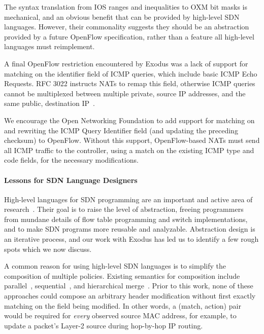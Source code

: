 The syntax translation from IOS ranges and inequalities to OXM bit masks is
mechanical, and an obvious benefit that can be provided  by high-level SDN languages.
However, their commonality suggests they should be an abstraction provided
by a future OpenFlow specification, rather than a feature all high-level languages
must reimplement.


A final OpenFlow restriction encountered by Exodus was a lack of support
for matching on the identifier field of ICMP queries, which include basic ICMP Echo
Requests. RFC 3022 instructs NATs to remap this field, otherwise ICMP
queries cannot be multiplexed between multiple private, source IP addresses,
and the same public, destination IP~\cite{rfc3022}.

We encourage the Open Networking Foundation to add support for matching
on and rewriting the ICMP Query Identifier field (and updating the preceding
checksum) to OpenFlow. Without this support, OpenFlow-based NATs
must send all ICMP traffic to the controller, using a match on the existing
ICMP type and code fields, for the necessary modifications.


\paragraph{Lessons for SDN Language Designers}

High-level languages for SDN programming are an important and active
area of research~\cite{foster:icfp11-frenetic,katta:xldi12-flog,monsanto++:nsdi13-pyretic,ngdfk:hotsdn13-flowlog,Voellmy:2011,voellmy:hotsdn12-procera,Voellmy:2013}. Their goal is to raise the level of abstraction, freeing
programmers from mundane details of flow table programming and switch
implementations, and to make SDN programs more reusable and analyzable.
Abstraction design is an iterative process, and our work with Exodus has
led us to identify a few rough spots which we now discuss.

A common reason for using high-level SDN languages is to simplify
the composition of multiple policies. Existing semantics for composition
include parallel~\cite{foster:icfp11-frenetic}, sequential~\cite{monsanto++:nsdi13-pyretic}, and hierarchical merge~\cite{Ferguson:2013sigcomm}. %
Prior to this work, none of these approaches could compose an arbitrary
header modification without first exactly matching on the field being modified.
In other words, a (match, action) pair would be required for \emph{every} observed source
MAC address, for example, to update a packet's Layer-2 source during hop-by-hop
IP routing.

